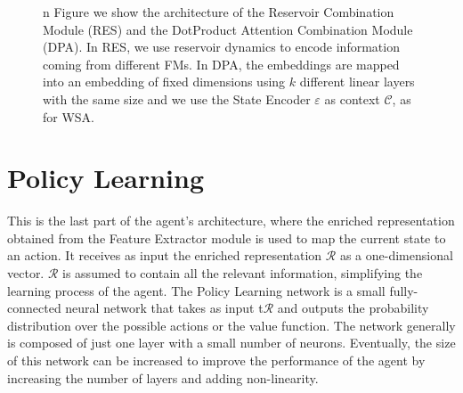 \begin{figure}[ht]
    \caption{n Figure we show the architecture of the Reservoir Combination Module (RES) and the DotProduct Attention Combination Module (DPA). In RES, we use reservoir dynamics to encode information coming from different FMs. In DPA, the embeddings are mapped into an embedding of fixed dimensions using $k$ different linear layers with the same size and we use the State Encoder $\varepsilon$ as context $\mathcal{C}$, as for WSA.}
    \label{fig:dpa_combination}
\end{figure}



\section{Policy Learning}\label{sec:policy_learning}
This is the last part of the agent's architecture, where the enriched representation obtained from the Feature Extractor module is used to map the current state to an action.
It receives as input the enriched representation $\mathcal{R}$ as a one-dimensional vector.
$\mathcal{R}$ is assumed to contain all the relevant information, simplifying the learning process of the agent.
The Policy Learning network is a small fully-connected neural network that takes as input t$\mathcal{R}$ and outputs the probability distribution over the possible actions or the value function.
The network generally is composed of just one layer with a small number of neurons.
Eventually, the size of this network can be increased to improve the performance of the agent by increasing the number of layers and adding non-linearity.